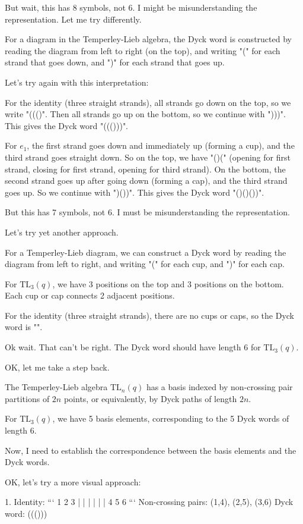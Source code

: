 \documentclass[12p]{article}
\newcounter{reasoningcounter}
\newenvironment{reasoning}[1][]
{\refstepcounter{reasoningcounter}%
\begin{tcolorbox}[
    title=Reasoning \thereasoningcounter: #1,
    colback=white, %
    colframe=gray,
    coltext=black, %
    fonttitle=\bfseries\normalsize,
    top=2mm,
    bottom=2mm,
    enlarge top initially by=5mm
]
\small
}
{\end{tcolorbox}}
\begin{document}
\begin{reasoning}
But wait, this has 8 symbols, not 6. I might be misunderstanding the representation. Let me try differently.

For a diagram in the Temperley-Lieb algebra, the Dyck word is constructed by reading the diagram from left to right (on the top), and writing "(" for each strand that goes down, and ")" for each strand that goes up.

Let's try again with this interpretation:

For the identity (three straight strands), all strands go down on the top, so we write "((()". Then all strands go up on the bottom, so we continue with ")))". This gives the Dyck word "((()))".

For $e_1$, the first strand goes down and immediately up (forming a cup), and the third strand goes straight down. So on the top, we have "()(" (opening for first strand, closing for first strand, opening for third strand). On the bottom, the second strand goes up after going down (forming a cap), and the third strand goes up. So we continue with ")())". This gives the Dyck word "()()())".

But this has 7 symbols, not 6. I must be misunderstanding the representation.

Let's try yet another approach.

For a Temperley-Lieb diagram, we can construct a Dyck word by reading the diagram from left to right, and writing "(" for each cup, and ")" for each cap.

For $\text{TL}_3(q)$, we have 3 positions on the top and 3 positions on the bottom. Each cup or cap connects 2 adjacent positions.

For the identity (three straight strands), there are no cups or caps, so the Dyck word is "".

Ok wait. That can't be right. The Dyck word should have length 6 for $\text{TL}_3(q)$.

OK, let me take a step back.

The Temperley-Lieb algebra $\text{TL}_n(q)$ has a basis indexed by non-crossing pair partitions of $2n$ points, or equivalently, by Dyck paths of length $2n$.

For $\text{TL}_3(q)$, we have 5 basis elements, corresponding to the 5 Dyck words of length 6.

Now, I need to establish the correspondence between the basis elements and the Dyck words.

OK, let's try a more visual approach:

1. Identity:
```
1 2 3
| | |
| | |
4 5 6
```
Non-crossing pairs: (1,4), (2,5), (3,6)
Dyck word: ((()))


\end{reasoning}
\end{document}
